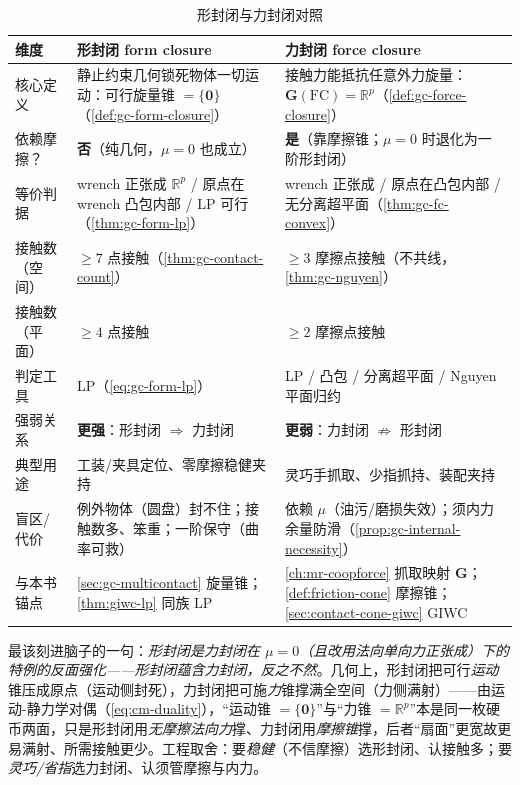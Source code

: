 \begin{table}[H]\centering\small
\caption{形封闭与力封闭对照}
\label{tab:gc-form-vs-force}
\begin{tabular}{p{2.6cm}p{5.4cm}p{5.4cm}}
\toprule
维度 & 形封闭 form closure & 力封闭 force closure \\
\midrule
核心定义 & 静止约束几何锁死物体一切运动：可行旋量锥 $=\{\mathbf{0}\}$（\cref{def:gc-form-closure}） & 接触力能抵抗任意外力旋量：$\mathbf{G}(\mathrm{FC})=\mathbb{R}^p$（\cref{def:gc-force-closure}） \\
依赖摩擦？ & \textbf{否}（纯几何，$\mu=0$ 也成立） & \textbf{是}（靠摩擦锥；$\mu=0$ 时退化为一阶形封闭） \\
等价判据 & wrench 正张成 $\mathbb{R}^p$ / 原点在 wrench 凸包内部 / LP 可行（\cref{thm:gc-form-lp}） & wrench 正张成 / 原点在凸包内部 / 无分离超平面（\cref{thm:gc-fc-convex}） \\
接触数（空间） & $\ge7$ 点接触（\cref{thm:gc-contact-count}） & $\ge3$ 摩擦点接触（不共线，\cref{thm:gc-nguyen}） \\
接触数（平面） & $\ge4$ 点接触 & $\ge2$ 摩擦点接触 \\
判定工具 & LP（\cref{eq:gc-form-lp}） & LP / 凸包 / 分离超平面 / Nguyen 平面归约 \\
强弱关系 & \textbf{更强}：形封闭 $\Rightarrow$ 力封闭 & \textbf{更弱}：力封闭 $\not\Rightarrow$ 形封闭 \\
典型用途 & 工装/夹具定位、零摩擦稳健夹持 & 灵巧手抓取、少指抓持、装配夹持 \\
盲区/代价 & 例外物体（圆盘）封不住；接触数多、笨重；一阶保守（曲率可救） & 依赖 $\mu$（油污/磨损失效）；须内力余量防滑（\cref{prop:gc-internal-necessity}） \\
与本书锚点 & \cref{sec:gc-multicontact} 旋量锥；\cref{thm:giwc-lp} 同族 LP & \cref{ch:mr-coopforce} 抓取映射 $\mathbf{G}$；\cref{def:friction-cone} 摩擦锥；\cref{sec:contact-cone-giwc} GIWC \\
\bottomrule
\end{tabular}
\end{table}

\begin{insight}
最该刻进脑子的一句：\emph{形封闭是力封闭在 $\mu=0$（且改用法向单向力正张成）下的特例的反面强化——形封闭蕴含力封闭，反之不然}。几何上，形封闭把可行\emph{运动}锥压成原点（运动侧封死），力封闭把可施\emph{力}锥撑满全空间（力侧满射）——由运动-静力学对偶（\cref{eq:cm-duality}），“运动锥 $=\{\mathbf{0}\}$”与“力锥 $=\mathbb{R}^p$”本是同一枚硬币两面，只是形封闭用\emph{无摩擦法向力}撑、力封闭用\emph{摩擦锥}撑，后者“扇面”更宽故更易满射、所需接触更少。工程取舍：要\emph{稳健}（不信摩擦）选形封闭、认接触多；要\emph{灵巧/省指}选力封闭、认须管摩擦与内力。
\end{insight}

